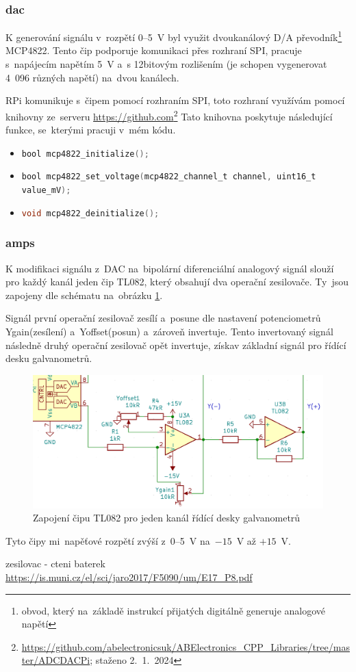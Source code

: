\subsubsection{dac\cite{mcp4822-dsh}}
K generování signálu v~rozpětí 0--5~V byl využit dvoukanálový D/A převodník\footnote{obvod, který na~základě instrukcí přijatých digitálně generuje analogové napětí} MCP4822.
Tento čip podporuje komunikaci přes rozhraní SPI, pracuje s~napájecím napětím 5~V a~s 12bitovým rozlišením (je schopen vygenerovat 4~096 různých napětí) na~dvou kanálech.

RPi komunikuje s~čipem pomocí rozhraním SPI, toto rozhraní využívám pomocí knihovny ze~serveru \url{https://github.com}\footnote{\url{https://github.com/abelectronicsuk/ABElectronics_CPP_Libraries/tree/master/ADCDACPi}; staženo 2.~1.~2024} 
Tato knihovna poskytuje následující funkce, se~kterými pracuji v~mém kódu.
\begin{itemize}
\item
\lstinline[language=C]!bool mcp4822_initialize();!
\item
\lstinline[language=C]!bool mcp4822_set_voltage(mcp4822_channel_t channel, uint16_t value_mV);!
\item
\lstinline[language=C]!void mcp4822_deinitialize();!
\end{itemize}
\subsubsection{amps\cite{tl082-dsh}}
K modifikaci signálu z~DAC na~bipolární diferenciální analogový signál slouží pro každý kanál jeden čip TL082, který obsahují dva operační zesilovače. Ty~jsou zapojeny dle schématu na~obrázku \ref{fig:ilda_amps-scheme}.

Signál první operační zesilovač zesílí a~posune dle nastavení potenciometrů Ygain(zesílení) a~Yoffset(posun) a~zároveň invertuje. Tento invertovaný signál následně druhý operační zesilovač opět invertuje, získav základní signál pro řídící desku galvanometrů.

\begin{figure}[!htb]
  \centering
  \includegraphics[width=1\textwidth]{img/ilda_amps.png} 
  \caption{\label{fig:ilda_amps-scheme} Zapojení čipu TL082 pro jeden kanál řídící desky galvanometrů}
\end{figure}

Tyto čipy mi~napěťové rozpětí zvýší z~0--5~V na~$-15$~V až $+15$~V.

zesilovac - cteni baterek \url{https://is.muni.cz/el/sci/jaro2017/F5090/um/E17_P8.pdf}
